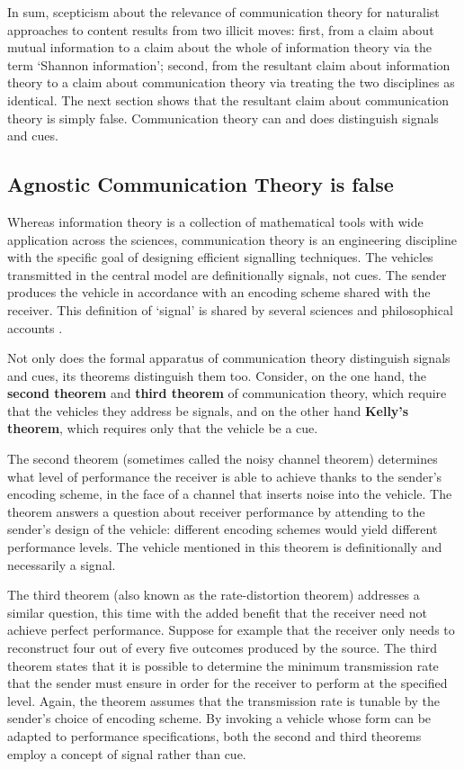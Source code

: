 In sum, scepticism about the relevance of communication theory for naturalist approaches to content results from two illicit moves: first, from a claim about mutual information to a claim about the whole of information theory via the term `Shannon information'; second, from the resultant claim about information theory to a claim about communication theory via treating the two disciplines as identical.
The next section shows that the resultant claim about communication theory is simply false.
Communication theory can and does distinguish signals and cues.


\subsection{{\sc Agnostic Communication Theory} is false}

Whereas information theory is a collection of mathematical tools with wide application across the sciences, communication theory is an engineering discipline with the specific goal of designing efficient signalling techniques.
The vehicles transmitted in the central model are definitionally signals, not cues.
The sender produces the vehicle in accordance with an encoding scheme shared with the receiver.
This definition of `signal' is shared by several sciences \citep{shannon1948mathematicala,maynardsmith2003animal} and philosophical accounts \citep[$\S$6]{millikan2004varieties} \citep{bergstrom2011transmission}.

Not only does the formal apparatus of communication theory distinguish signals and cues, its theorems distinguish them too.
Consider, on the one hand, the \textbf{second theorem} and \textbf{third theorem} of communication theory, which require that the vehicles they address be signals, and on the other hand \textbf{Kelly's theorem}, which requires only that the vehicle be a cue.

The second theorem (sometimes called the noisy channel theorem) determines what level of performance the receiver is able to achieve thanks to the sender's encoding scheme, in the face of a channel that inserts noise into the vehicle.
The theorem answers a question about receiver performance by attending to the sender's design of the vehicle: different encoding schemes would yield different performance levels.
The vehicle mentioned in this theorem is definitionally and necessarily a signal.

The third theorem (also known as the rate-distortion theorem) addresses a similar question, this time with the added benefit that the receiver need not achieve perfect performance.
Suppose for example that the receiver only needs to reconstruct four out of every five outcomes produced by the source.
The third theorem states that it is possible to determine the minimum transmission rate that the sender must ensure in order for the receiver to perform at the specified level.
Again, the theorem assumes that the transmission rate is tunable by the sender's choice of encoding scheme.
By invoking a vehicle whose form can be adapted to performance specifications, both the second and third theorems employ a concept of signal rather than cue.

